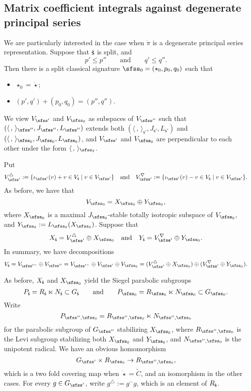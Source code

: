 \documentclass[12pt,a4paper]{amsart}
\newcommand{\la}{\langle}
\newcommand{\ra}{\rangle}
\numberwithin{equation}{section}
\theoremstyle{remark}
\begin{document}
\subsection{Matrix coefficient integrals against degenerate principal series}
\label{sec:DP}

We are particularly interested in the case when $\dot \pi$ is a degenerate principal series representation.
Suppose that ${\dot{\mathsf s}}$ is split,  and
\[
  p'\leq p''\qquad\textrm{and}\qquad q'\leq q''.
\]
Then there is a  split classical signature $\sfss_0=(\star_0, p_0, q_0)$ such that
\begin{itemize}
\item $\star_0=\dot \star$;
  \item $(p', q')+(p_0, q_0)=(p'', q'')$.
\end{itemize}
We view $V_{\sfss'}$  and $V_{\sfss_0}$ as subspaces of $V_{\sfss''}$ such that $(\la\,,\,\ra_{\sfss''}, J_{\sfss''},L_{\sfss''})$  extends  both $(\la\,,\,\ra_{\mathsf s'}, J_{\mathsf s'}, L_{\mathsf s'})$ and $(\la\,,\,\ra_{\sfss_0}, J_{\sfss_0},L_{\sfss_0})$, and  $V_{\sfss'}$  and $V_{\sfss_0}$ are perpendicular to each other under the form $\la\, ,\,\ra_{\sfss_2}$.


Put
\[
   V_{\sfss'}^\triangle:=\{\iota_{\sfss'}(v)+v\in V_\dsfss \mid v\in V_{\sfss'}\}\quad\textrm{and}\quad V_{\sfss'}^\nabla:=\{\iota_{\sfss'}(v)-v\in V_\dsfss \mid v\in V_{\sfss'}\}.
 \]
As before, we have that
\[
  V_{\sfss_0}=X_{\sfss_0}\oplus Y_{\sfss_0},
\]
where $X_{\sfss_0}$ is a maximal $J_{\sfss_0}$-stable totally isotropic subspace of $V_{\sfss_0}$, and $Y_{\sfss_0}:=L_{\sfss_0}(X_{\sfss_0})$.
Suppose that
 \[
 X_{\dsfss}= V_{\sfss'}^\triangle \oplus X_{\sfss_0}\quad\textrm{and}\quad Y_{\dsfss}=V_{\sfss'}^\nabla \oplus Y_{\sfss_0}.
 \]
In summary, we have decompositions
\[
  V_{\dsfss}=V_{\sfss'^-}\oplus V_{\sfss''}= V_{\sfss'^-}\oplus V_{\sfss'}\oplus  V_{\sfss_0}= (V_{\sfss'}^\triangle \oplus X_{\sfss_0})\oplus (V_{\sfss'}^\nabla \oplus Y_{\sfss_0}).
\]

As before, $X_{\dot{\mathsf s}}$ and $X_{\sfss_0}$ yield
 the Siegel parabolic subgroups
 \[
  P_{\dsfss}=R_{\dsfss}\ltimes N_\dsfss\subset G_\dsfss\qquad \textrm{and}\qquad P_{\sfss_0}=R_{\sfss_0}\ltimes N_{\sfss_0}\subset G_{\sfss_0}.
 \]
 Write
\[
  P_{\sfss'',\sfss_0}=R_{\sfss'',\sfss_0}\ltimes N_{\sfss'',\sfss_0}
\]
for the parabolic subgroup of $G_{\sfss''}$ stabilizing $X_{\sfss_0}$, where $R_{\sfss'',\sfss_0}$ is the Levi subgroup stabilizing both $X_{\sfss_0}$ and $Y_{\sfss_0}$, and $N_{\sfss'',\sfss_0}$ is the unipotent radical. We have an obvious homomorphism
\[
  G_{\sfss'}\times R_{\sfss_0}\rightarrow R_{\sfss'',\sfss_0},
\]
which is a two fold covering map when $\dot \star=\widetilde C$, and an isomorphism in the other cases.
For every $g\in G_{\sfss'}$, write $g^\triangle:= g^- g$, which is an element of $R_{{\dot{\mathsf s}}}$.
\end{document}
